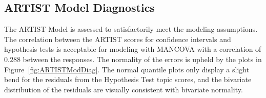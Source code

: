 \documentclass[11pt]{isuthesis}\usepackage[]{graphicx}\usepackage[]{color}
\begin{document}
\begin{appendices}
% 
% 
% 


\subsection{ARTIST Model Diagnostics}
\label{appARTISTModDiag}


The ARTIST Model is assessed to satisfactorily meet the modeling assumptions. The correlation between the ARTIST scores for confidence intervals and hypothesis tests is acceptable for modeling with MANCOVA with a correlation of $0.288$ between the responses.  The normality of the errors is upheld by the plots in Figure~\ref{fig:ARTISTModDiag}.  The normal quantile plots only display a slight bend for the residuals from the Hypothesis Test topic scores, and the bivariate distribution of the residuals are visually consistent with bivariate normality. 




\end{appendices}
\end{document}
